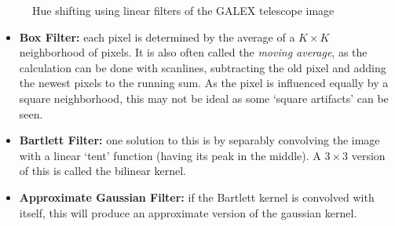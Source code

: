 \documentclass[twoside,a4paper,article]{combine}
\begin{document}
\begin{minipage}{\textwidth}\begin{figure}[H]
    \centering
    \caption{Hue shifting using linear filters of the GALEX telescope image\cite{NASA_on_The_Commons_23}}
    \label{fig:hueshift}
\end{figure}\end{minipage}
\begin{itemize}
    \item \textbf{Box Filter:} each pixel is determined by the average of a $K \times K$ 
        neighborhood of pixels. It is also often called the \emph{moving average}, as the calculation can be done with scanlines, subtracting the
        old pixel and adding the newest pixels to the running sum. As the pixel is influenced equally by a square neighborhood, this may not be ideal as some `square artifacts' can be seen.
    \item \textbf{Bartlett Filter:} one solution to this is by separably convolving the image
        with a linear `tent' function (having its peak in the middle). A $3\times 3$ version of this is called the bilinear kernel.
    \item \textbf{Approximate Gaussian Filter:} if the Bartlett kernel is convolved with itself, this will produce an approximate version of the gaussian kernel.
\end{itemize}
\end{document}
